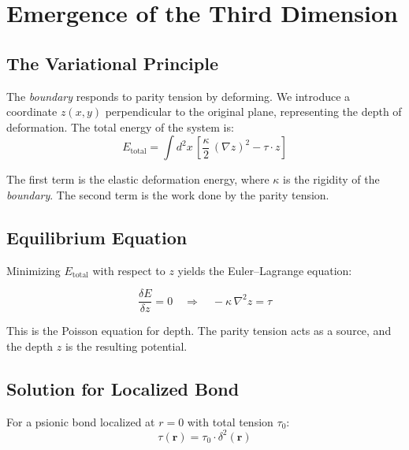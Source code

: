 \documentclass[12pt,a4paper,twoside]{article}
\newcommand{\boundary}{\textit{boundary}}
\begin{document}

\section{Emergence of the Third Dimension}


\subsection{The Variational Principle}

The \boundary{} responds to parity tension by deforming. We introduce a coordinate $z(x,y)$ perpendicular to the original plane, representing the depth of deformation. The total energy of the system is:
\begin{equation}
E_{\text{total}} = \int d^2x\,\left[\frac{\kappa}{2}\,(\nabla z)^2 - \tau\cdot z\right]
\label{eq:energia_total}
\end{equation}

The first term is the elastic deformation energy, where $\kappa$ is the rigidity of the \boundary. The second term is the work done by the parity tension.

\subsection{Equilibrium Equation}

Minimizing $E_{\text{total}}$ with respect to $z$ yields the Euler--Lagrange equation:
\begin{equationbox}[title={Poisson Equation for the Depth}]
\begin{equation}
\frac{\delta E}{\delta z} = 0 \quad\Longrightarrow\quad -\kappa\,\nabla^2 z = \tau
\label{eq:poisson_profundidade}
\end{equation}
\end{equationbox}

\noindent This is the Poisson equation for depth. The parity tension acts as a source, and the depth $z$ is the resulting potential.

\subsection{Solution for Localized Bond}

For a psionic bond localized at $r = 0$ with total tension $\tau_0$:
\begin{equation}
\tau(\mathbf{r}) = \tau_0\cdot\delta^2(\mathbf{r})
\end{equation}
\end{document}
